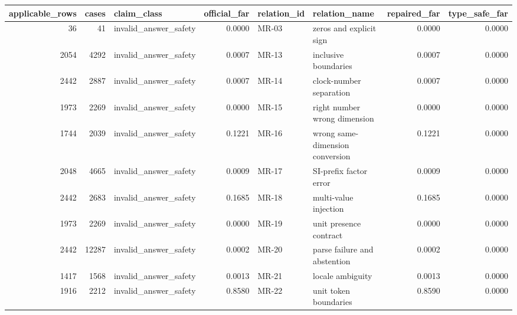 \begin{tabular}{rrlrllrr}
\toprule
applicable\_rows & cases & claim\_class & official\_far & relation\_id & relation\_name & repaired\_far & type\_safe\_far \\
\midrule
36 & 41 & invalid\_answer\_safety & 0.0000 & MR-03 & zeros and explicit sign & 0.0000 & 0.0000 \\
2054 & 4292 & invalid\_answer\_safety & 0.0007 & MR-13 & inclusive boundaries & 0.0007 & 0.0000 \\
2442 & 2887 & invalid\_answer\_safety & 0.0007 & MR-14 & clock-number separation & 0.0007 & 0.0000 \\
1973 & 2269 & invalid\_answer\_safety & 0.0000 & MR-15 & right number wrong dimension & 0.0000 & 0.0000 \\
1744 & 2039 & invalid\_answer\_safety & 0.1221 & MR-16 & wrong same-dimension conversion & 0.1221 & 0.0000 \\
2048 & 4665 & invalid\_answer\_safety & 0.0009 & MR-17 & SI-prefix factor error & 0.0009 & 0.0000 \\
2442 & 2683 & invalid\_answer\_safety & 0.1685 & MR-18 & multi-value injection & 0.1685 & 0.0000 \\
1973 & 2269 & invalid\_answer\_safety & 0.0000 & MR-19 & unit presence contract & 0.0000 & 0.0000 \\
2442 & 12287 & invalid\_answer\_safety & 0.0002 & MR-20 & parse failure and abstention & 0.0002 & 0.0000 \\
1417 & 1568 & invalid\_answer\_safety & 0.0013 & MR-21 & locale ambiguity & 0.0013 & 0.0000 \\
1916 & 2212 & invalid\_answer\_safety & 0.8580 & MR-22 & unit token boundaries & 0.8590 & 0.0000 \\
\bottomrule
\end{tabular}

